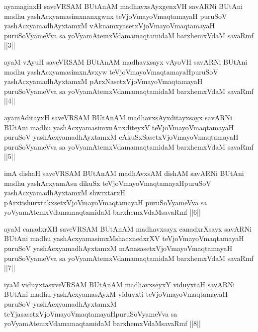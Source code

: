 
\begin{kandikeshl}
ayamaginxH saveVRSAM BUtAnAM madhavxsAyxgenxVH savARNi BUtAni madhu yashAcxyamasimxnanxgwnx teVjoVmayoV\s maqtamayaH puruSoV yashAcxyamadhAyxtamxM vAknamxyasetxVjoVmayoV\s maqtamayaH puruSoV\s yameVva sa yoV\s yamAtemxVdamamaqtamidaM barxhemxVdaM savaRmf ||3||
\end{kandikeshl}


\begin{kandikeshl}
ayaM vAyuH saveVRSAM BUtAnAM madhavxsayx vAyoVH savARNi BUtAni madhu yashAcxyamasimxnAvxyw teVjoVmayoV\s maqtamayaH\break puruSoV yashAcxyamadhAyxtamxM pArxNasetxVjoVmayoV\s maqtamayaH puruSoV\s yameVva sa yoV\s yamAtemxVdamamaqtamidaM barxhemxVdaM savaRmf ||4||
\end{kandikeshl}


\begin{kandikeshl}
ayamAditayxH saveVRSAM BUtAnAM madhavxsAyxditayxsayx savARNi BUtAni madhu yashAcxyamasimxnAnxditeyxV teVjoVmayoV\s maqtamayaH puruSoV yashAcxyamadhAyxtamxM cAkuSxSasetxVjoVmayoV\s maqtamayaH puruSoV\s\break yameVva sa yoV\s yamAtemxVdamamaqtamidaM barxhemxVdaM savaRmf ||5||
\end{kandikeshl}


\begin{kandikeshl}
imA dishaH saveVRSAM BUtAnAM madhAvxsAM dishAM savARNi BUtAni madhu yashAcxyamAsu dikuSx teVjoVmayoV\s maqtamayaH\break puruSoV yashAcxyamadhAyxtamxM shwrxtarxH pArxtishurxtakxsetxVjoVmayoV\s maqtamayaH puruSoV\s yameVva sa yoV\s yamAtemxVdamamaqtamidaM barxhemxVdaM\break savaRmf ||6||
\end{kandikeshl}


\begin{kandikeshl}
ayaM canadxrXH saveVRSAM BUtAnAM madhavxsayx canadxrXsayx savARNi BUtAni madhu yashAcxyamasimxMshacxnedxrXV teVjoVmayoV\s maqtamayaH puruSoV yashAcxyamadhAyxtamxM mAnasasetxVjoVmayoV\s maqtamayaH puruSoV\s yameVva sa yoV\s yamAtemxVdamamaqtamidaM barxhemxVdaM savaRmf ||7||
\end{kandikeshl}


\begin{kandikeshl}
iyaM viduyxtasxveVRSAM BUtAnAM madhavxseyxY viduyxtaH savARNi BUtAni madhu yashAcxyamasAyxM viduyxti teVjoVmayoV\s maqtamayaH puruSoV yashAcxyamadhAyxtamxM teYjasasetxVjoVmayoV\s maqtamayaH\break puruSoV\s yameVva sa yoV\s yamAtemxVdamamaqtamidaM barxhemxVdaM\break savaRmf ||8||
\end{kandikeshl}

